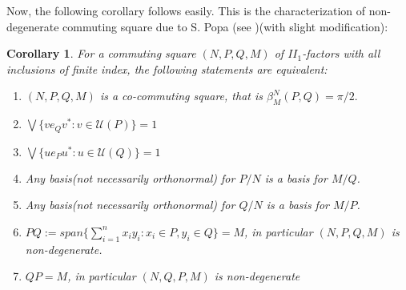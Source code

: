 \documentclass[11pt,letterpaper]{amsart}
\newtheorem{corollary}[theorem]{Corollary}
\theoremstyle{definition}
\theoremstyle{remark}
\begin{document}
 
 

Now, the following corollary follows easily. This is the characterization of non-degenerate commuting square due to S. Popa (see \cite{Po2})(with slight modification):

\begin{corollary}\cite{Po2}\label{po2}
For a commuting square $(N,P,Q,M)$ of $II_1$-factors with all inclusions of finite index, the following statements are equivalent:
 \begin{enumerate}
 
 \item
  $(N,P,Q,M)$ is a co-commuting square, that is $\beta^N_M(P,Q)= \pi/2.$

   \item $\bigvee\{ve_Qv^*: v\in \mathcal{U}(P)\}=1$
 
 
 \item  $\bigvee\{ue_Pu^*: u\in \mathcal{U}(Q)\}=1$
 
 
 
 \item  Any basis(not necessarily orthonormal) for $P/N$ is a basis for $M/Q$.
 

 \item Any  basis(not necessarily orthonormal) for $Q/N$ is a basis for $M/P$.
 
 
 \item  $PQ:= span\{\sum_{i=1}^n x_iy_i:x_i\in P, y_i\in Q\} = M$, in particular $(N,P,Q,M)$ is non-degenerate.
 
 
 \item  $QP= M$, in particular $(N,Q,P,M)$ is non-degenerate
 \end{enumerate}
\end{corollary}
\end{document}
